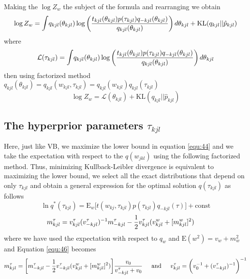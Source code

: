 \documentclass[]{article}
\begin{document}
Making the $\log Z_w$ the subject of the formula and rearranging we obtain
\begin{equation}
	\log Z_w = \mathlarger \int q_{kjl}(\theta_{kjl}) \log\bigg( \frac{{t}_{kjl}(\theta_{kjl})p(\tau_{kjl})q_{-kjl}(\theta_{kjl})}{q_{kjl}(\theta_{kjl})}\bigg)\hspace{0.02in} d\theta_{kjl} + \text{KL}(q_{kjl}||\hat{p}_{kjl})
	\label{equ:42}
\end{equation}
where 
\begin{equation}
	\mathcal{L}(\tau_{kjl}) = \mathlarger \int q_{kjl}(\theta_{kjl}) \log\bigg( \frac{{t}_{kjl}(\theta_{kjl})p(\tau_{kjl})q_{-kjl}(\theta_{kjl})}{q_{kjl}(\theta_{kjl})}\bigg)\hspace{0.02in} d\theta_{kjl}
	\label{equ:43}
\end{equation}
then using factorized method $q_{kjl}(\theta_{kjl}) = q_{kjl}(w_{kjl}, \tau_{kjl}) = q_{kjl}(w_{kjl})q_{kjl}(\tau_{kjl})$ 
\begin{equation}
	\log Z_w = \mathcal{L}(\theta_{kjl}) + \text{KL}(q_{kjl}||\hat{p}_{kjl})
	\label{equ:44}
\end{equation}
\subsection{The hyperprior parameters $\tau_{kjl}$}
Here, just like VB, we maximize the lower bound in equation \ref{equ:44} and we take the expectation with respect to the $q(w_{jkl})$ using the following factorized method.
Thus, minimizing Kullback-Leibler divergence is equivalent to maximizing the lower bound, we select all the exact distributions that depend on only $\tau_{kjl}$ and obtain a general expression for the optimal solution $q(\tau_{kjl})$ as follows
\begin{equation}
	\ln q^*(\tau_{kjl}) = \mathrm{E}_w\bigg[t(w_{kj},\tau_{kjl})p(\tau_{kjl})q_{-kjl}(\tau)\bigg] + \text{const}
	\label{equ:45}
\end{equation}
\begin{equation}
	m^\tau_{kjl} = v^\tau_{kjl} (v^\tau_{-kjl})^{-1} m^\tau_{-kjl} - \frac{1}{2} v^{\tau}_{kjl}(v^w_{kjl} + [m^w_{kjl}]^2)\hspace*{0.2in}
	\label{equ:46}
\end{equation}
where we have used the expectation with respect to $q_w$ and $\mathrm{E}(w^2) = v_w + m^2_w$ and Equation \ref{equ:46} becomes
\begin{equation}
	m^\tau_{kjl} = \bigg[m^\tau_{-kjl} - \frac{1}{2} v_{-kjl}^{\tau}(v^w_{kjl} + [m^w_{kjl}]^2)\bigg]\frac{v_0}{v_{-kjl}^{\tau} + v_0}\hspace*{0.2in} \text{and} \hspace{0.2in}v^\tau_{kjl} = \bigg(v^{-1}_0 + (v^\tau_{-kjl})^{-1}\bigg)^{-1}
	\label{equ:47}
\end{equation}
\end{document}
